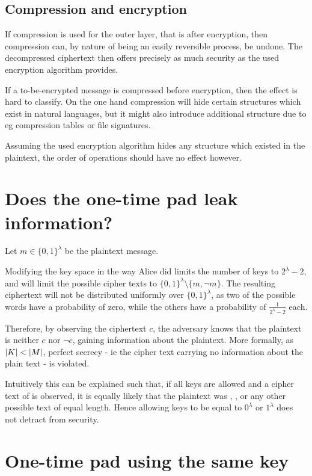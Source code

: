 \documentclass[a4paper]{scrreprt}
\DeclarePairedDelimiter\abs{\lvert}{\rvert}
\begin{document}
\subsection{Compression and encryption}

If compression is used for the outer layer, that is after encryption, then
compression can, by nature of being an easily reversible process, be undone.
The decompressed ciphertext then offers precisely as much security as the used
encryption algorithm provides.

If a to-be-encrypted message is compressed before encryption, then the effect
is hard to classify. On the one hand compression will hide certain structures
which exist in natural languages, but it might also introduce additional
structure due to eg compression tables or file signatures.

Assuming the used encryption algorithm hides any structure which existed in the
plaintext, the order of operations should have no effect however.

\section{Does the one-time pad leak information?}

Let $m \in \{0, 1\}^\lambda$ be the plaintext message.

Modifying the key space in the way Alice did limits the number of keys to
$2^\lambda - 2$, and will limit the possible cipher texts to $\{0, 1\}^\lambda
\setminus \{m, \neg m\}$. The resulting ciphertext will not be distributed
uniformly over $\{0, 1\}^\lambda$, as two of the possible words have a
probability of zero, while the others have a probability of $\frac{1}{2^\lambda
- 2}$ each.

Therefore, by observing the ciphertext $c$, the adversary knows that the
plaintext is neither $c$ nor $\neg c$, gaining information about the plaintext.
More formally, as $\abs{K} < \abs{M}$, perfect secrecy - ie the cipher text
carrying no information about the plain text - is violated.

Intuitively this can be explained such that, if all keys are allowed and a
cipher text of  is observed, it is equally likely that the
plaintext was , , or any other
possible text of equal length. Hence allowing keys to be equal to $0^\lambda$
or $1^\lambda$ does not detract from security.

\section{One-time pad using the same key}
\end{document}
